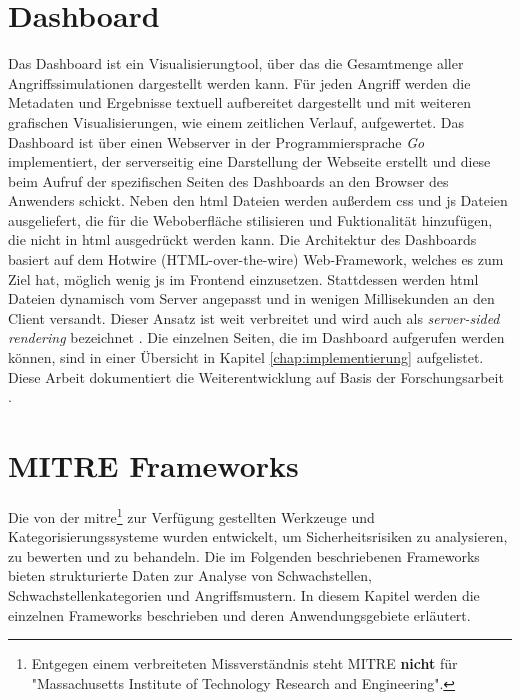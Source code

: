 \section{Dashboard}
\label{sec:tech-dashboard}
Das Dashboard ist ein Visualisierungtool, über das die Gesamtmenge aller Angriffssimulationen dargestellt werden kann. Für jeden Angriff werden die Metadaten und Ergebnisse textuell aufbereitet dargestellt und mit weiteren grafischen Visualisierungen, wie einem zeitlichen Verlauf, aufgewertet.
Das Dashboard ist über einen Webserver in der Programmiersprache \textit{Go} implementiert, der serverseitig eine Darstellung der Webseite erstellt und diese beim Aufruf der spezifischen Seiten des Dashboards an den Browser des Anwenders schickt. Neben den \gls{html} Dateien werden außerdem \gls{css} und \gls{js} Dateien ausgeliefert, die für die Weboberfläche stilisieren und Fuktionalität hinzufügen, die nicht in \gls{html} ausgedrückt werden kann. Die Architektur des Dashboards basiert auf dem Hotwire (HTML-over-the-wire) Web-Framework, welches es zum Ziel hat, möglich wenig \gls{js} im Frontend einzusetzen. Stattdessen werden \gls{html} Dateien dynamisch vom Server angepasst und in wenigen Millisekunden an den Client versandt. Dieser Ansatz ist weit verbreitet und wird auch als \textit{server-sided rendering} bezeichnet \autocite{HTMLWireHotwire}. Die einzelnen Seiten, die im Dashboard aufgerufen werden können, sind in einer Übersicht in Kapitel \ref{chap:implementierung} aufgelistet.
Diese Arbeit dokumentiert die Weiterentwicklung auf Basis der Forschungsarbeit \autocite{weberEvaluationDashboardTechniques}.

\label{bg:mitre-frameworks}
\section{MITRE Frameworks}
Die von der \gls{mitre}\footnote{Entgegen einem verbreiteten Missverständnis steht MITRE \textbf{nicht} für "Massachusetts Institute of Technology Research and Engineering".} zur Verfügung gestellten Werkzeuge und Kategorisierungssysteme wurden entwickelt, um Sicherheitsrisiken zu analysieren, zu bewerten und zu behandeln. Die im Folgenden beschriebenen Frameworks bieten strukturierte Daten zur Analyse von Schwachstellen, Schwachstellenkategorien und Angriffsmustern. In diesem Kapitel werden die einzelnen Frameworks beschrieben und deren Anwendungsgebiete erläutert.

